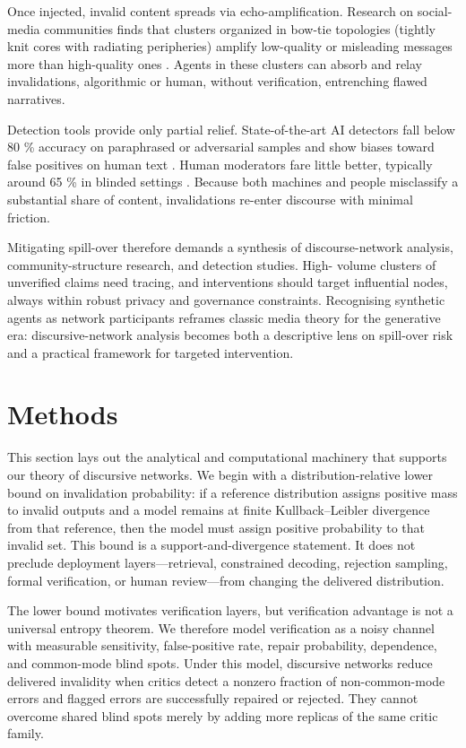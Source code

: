 \documentclass[12pt]{article}
\theoremstyle{definition}
\begin{document}
Once injected, invalid content spreads via echo-amplification.
Research on social-media communities finds that clusters organized in
bow-tie topologies (tightly knit cores with radiating peripheries) amplify
low-quality or misleading messages more than high-quality ones
\parencite{garimella2018}.  Agents in these clusters can absorb and relay
invalidations, algorithmic or human, without verification, entrenching
flawed narratives.

Detection tools provide only partial relief.  State-of-the-art AI
detectors fall below 80 \% accuracy on paraphrased or adversarial
samples and show biases toward false positives on human text
\parencite{huang2024robust,tufts2024practical,sadasivan2025reliably}.  Human moderators fare little better, typically
around 65 \% in blinded settings \parencite{ippolito2020}.  Because both
machines and people misclassify a substantial share of content,
invalidations re-enter discourse with minimal friction.

Mitigating spill-over therefore demands a synthesis of discourse-network
analysis, community-structure research, and detection studies.  High-
volume clusters of unverified claims need tracing, and interventions
should target influential nodes, always within robust privacy and
governance constraints.  Recognising synthetic agents as network
participants reframes classic media theory for the generative era:
discursive-network analysis becomes both a descriptive lens on
spill-over risk and a practical framework for targeted intervention.

\section{Methods}
This section lays out the analytical and computational machinery that supports
our theory of discursive networks.  We begin with a distribution-relative lower
bound on invalidation probability: if a reference distribution assigns positive
mass to invalid outputs and a model remains at finite Kullback--Leibler
divergence from that reference, then the model must assign positive probability
to that invalid set.  This bound is a support-and-divergence statement.  It does
not preclude deployment layers---retrieval, constrained decoding, rejection
sampling, formal verification, or human review---from changing the delivered
distribution.

The lower bound motivates verification layers, but verification advantage is not
a universal entropy theorem.  We therefore model verification as a noisy channel
with measurable sensitivity, false-positive rate, repair probability,
dependence, and common-mode blind spots.  Under this model, discursive networks
reduce delivered invalidity when critics detect a nonzero fraction of
non-common-mode errors and flagged errors are successfully repaired or rejected.
They cannot overcome shared blind spots merely by adding more replicas of the
same critic family.
\end{document}
